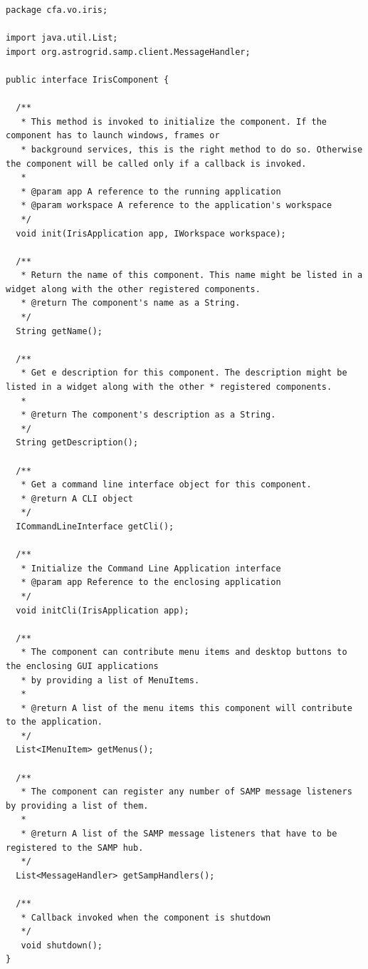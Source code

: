 \documentclass[final,5p,authoryear]{elsarticle}
\begin{document}
\begin{lstlisting}[style=java,
	caption={This snippet of code represents the main interface that all components in Iris have to implement, and how dependencies get injected into the components at run-time.}, 		
	label=lst:component]
package cfa.vo.iris;

import java.util.List;
import org.astrogrid.samp.client.MessageHandler;

public interface IrisComponent {

  /**
   * This method is invoked to initialize the component. If the component has to launch windows, frames or
   * background services, this is the right method to do so. Otherwise the component will be called only if a callback is invoked.
   * 
   * @param app A reference to the running application
   * @param workspace A reference to the application's workspace
   */
  void init(IrisApplication app, IWorkspace workspace);

  /**
   * Return the name of this component. This name might be listed in a widget along with the other registered components.
   * @return The component's name as a String. 
   */
  String getName();

  /**
   * Get e description for this component. The description might be listed in a widget along with the other * registered components.
   *
   * @return The component's description as a String.
   */
  String getDescription();

  /**
   * Get a command line interface object for this component.
   * @return A CLI object
   */
  ICommandLineInterface getCli();

  /**
   * Initialize the Command Line Application interface
   * @param app Reference to the enclosing application
   */
  void initCli(IrisApplication app);

  /**
   * The component can contribute menu items and desktop buttons to the enclosing GUI applications
   * by providing a list of MenuItems.
   *
   * @return A list of the menu items this component will contribute to the application. 
   */
  List<IMenuItem> getMenus();

  /**
   * The component can register any number of SAMP message listeners by providing a list of them.
   *
   * @return A list of the SAMP message listeners that have to be registered to the SAMP hub. 
   */
  List<MessageHandler> getSampHandlers();

  /**
   * Callback invoked when the component is shutdown
   */
   void shutdown();
}
\end{lstlisting}
\end{document}
